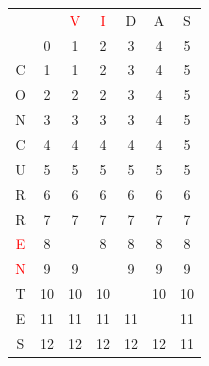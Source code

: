 \documentclass[10pt,a4paper,spanish]{report}
\theoremstyle{definition}
\theoremstyle{remark}
\begin{document}
\begin{enumerate}
\begin{center}
\begin{tabular}{c|c|c|c|c|c|c|}
\multicolumn{2}{r}{} & \multicolumn{1}{c}{\textcolor{Red}{V}} & \multicolumn{1}{c}{\textcolor{Red}{I}} & \multicolumn{1}{c}{D} & \multicolumn{1}{c}{A} & \multicolumn{1}{c}{S} \\ 
\cline{2-7} 
& $0$ & 1 & 2 & 3 & 4 & 5 \\
\cline{2-7} 
C & 1 & 1 & 2 & 3 & 4 & 5 \\
\cline{2-7}
O & 2 & 2 & 2 & 3 & 4 & 5 \\
\cline{2-7} 
N & 3 & 3 & 3 & 3 & 4 & 5 \\
\cline{2-7} 
C & 4 & 4 & 4 & 4 & 4 & 5 \\
\cline{2-7} 
U & 5 & 5 & 5 & 5 & 5 & 5 \\
\cline{2-7} 
R & 6 & 6 & 6 & 6 & 6 & 6 \\
\cline{2-7} 
R & 7 & \cellcolor{Cyan}7 & 7 & 7 & 7 & 7 \\
\cline{2-7} 
\textcolor{Red}{E} & 8 & \cellcolor{Green}{8} & 8 & 8 & 8 & 8 \\
\cline{2-7} 
\textcolor{Red}{N} & 9 & 9 & \cellcolor{Green}{9} & 9 & 9 & 9 \\
\cline{2-7} 
T & 10 & 10 & 10 & \cellcolor{Green}{10} & 10 & 10 \\
\cline{2-7} 
E & 11 & 11 & 11 & 11 & \cellcolor{Green}{11} & 11 \\
\cline{2-7} 
S & 12 & 12 & 12 & 12 & 12 & \cellcolor{Green}11 \\
\cline{2-7}
\end{tabular}
\end{center}


\end{enumerate}
\end{document}
